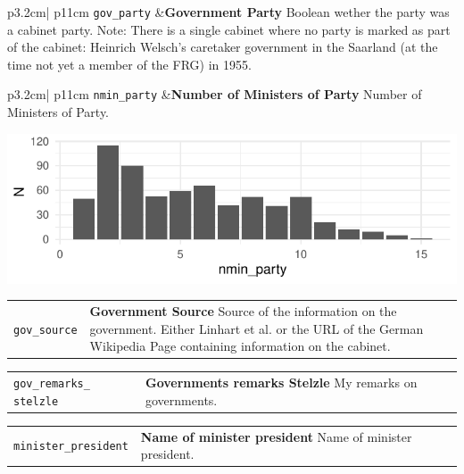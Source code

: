 \documentclass[
]{article}
\begin{document}
\begin{longtable}{p{3.2cm}| p{11cm}}
\texttt{gov\_party} &\textbf{Government Party}\newline 
Boolean wether the party was a cabinet party. Note: There is a single cabinet where no party is marked as part of the cabinet: Heinrich Welsch's caretaker government in the Saarland (at the time not yet a member of the FRG) in 1955.
\end{longtable}

\begin{longtable}{p{3.2cm}| p{11cm}}
\texttt{nmin\_party} &\textbf{Number of Ministers of Party}\newline 
Number of Ministers of Party.



\hspace*{.25cm}
\begin{minipage}[t]{\linewidth }
\vspace{0pt}
\includegraphics[width = \linewidth]{cbgov/nminpartyplot.pdf}
\end{minipage}



\end{longtable}

\begin{longtable}{p{3.2cm}| p{11cm}}
\texttt{gov\_source} &\textbf{Government Source}\newline 
Source of the information on the government. Either Linhart et al. or the URL of the German Wikipedia Page containing information on the cabinet.
\end{longtable}

\begin{longtable}{p{3.2cm}| p{11cm}}
\texttt{gov\_remarks\_
stelzle} &\textbf{Governments remarks Stelzle}\newline 
My remarks on governments.
\end{longtable}

\begin{longtable}{p{3.2cm}| p{11cm}}
\texttt{minister\_president} &\textbf{Name of minister president}\newline 
Name of minister president.
\end{longtable}
\end{document}
